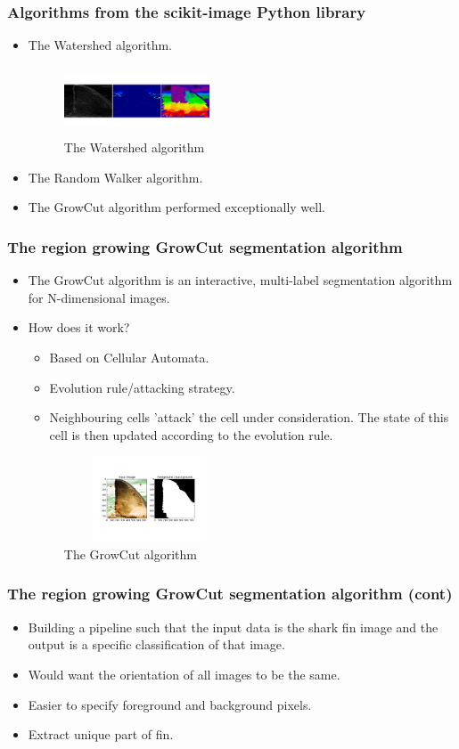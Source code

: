 \documentclass{beamer}
\newcommand{\myitem}{\item[$-$]}
\begin{document}
\begin{frame}
\frametitle{Algorithms from the scikit-image Python library}
\begin{itemize}
\item The Watershed\cite{scikit-image} algorithm.
\begin{figure}
 \centering
 \includegraphics[width=1.7in, height=0.8in]{watershed.png}
 \caption{The Watershed algorithm}
 \end{figure}
\item The Random Walker\cite{scikit-image} algorithm.
\item The GrowCut algorithm performed exceptionally well.
\end{itemize}
\end{frame}

\begin{frame}
\frametitle{The region growing GrowCut segmentation algorithm}
\begin{itemize}
\item The GrowCut algorithm is an interactive, multi-label segmentation algorithm for N-dimensional images\cite{alg}.
\item How does it work? 
\begin{itemize}
\myitem Based on Cellular Automata\cite{cellularoutomata}.
\myitem Evolution rule/attacking strategy.
\myitem Neighbouring cells 'attack' the cell under consideration.  The state of this cell is then updated
according to the evolution rule.
\end{itemize}
\begin{figure}
\centering
\includegraphics[width=2in, height=1in]{demo1.png}
\caption{The GrowCut algorithm}
\end{figure}
\end{itemize}
\end{frame}

\begin{frame}
\frametitle{The region growing GrowCut segmentation algorithm (cont)}
\begin{itemize}
\item Building a pipeline such that the input data is the shark fin image and the output is a specific
classification of that image.
\item Would want the orientation of all images to be the same.
\item Easier to specify foreground and background pixels.
\item Extract unique part of fin.
\end{itemize}
\end{frame}
\end{document}
